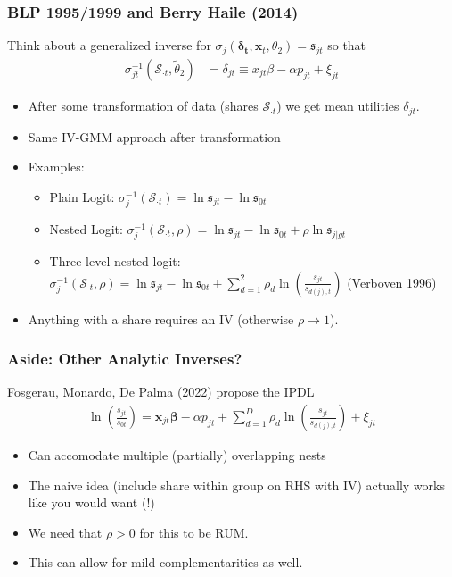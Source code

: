 \begin{frame}
\frametitle{BLP 1995/1999 and Berry Haile (2014)}
Think about a \alert{generalized inverse} for $\sigma_{j}(\boldsymbol{\delta_{t}}, \mathbf{x}_t,\theta_2) = \mathfrak{s}_{jt}$ so that 
\begin{align*}
 \sigma_{jt}^{-1}(\mathcal{S}_{\cdot t},\widetilde{\theta}_2)&= \delta_{jt} \equiv x_{jt} \beta -\alpha p_{jt} +  \xi_{jt} 
\end{align*}
 \begin{itemize}
\item After some transformation of data (shares $\mathcal{S}_{\cdot t}$) we get \alert{mean utilities} $\delta_{jt}$.
\item Same IV-GMM approach after transformation
\item Examples:
\begin{itemize}
\item Plain Logit: $\sigma_{j}^{-1}(\mathcal{S}_{\cdot t}) = \ln \mathfrak{s}_{jt}- \ln \mathfrak{s}_{0t}$
\item Nested Logit: $\sigma_{j}^{-1}(\mathcal{S}_{\cdot t},\rho) = \ln \mathfrak{s}_{jt}- \ln \mathfrak{s}_{0t} + \rho  \ln \mathfrak{s}_{j|gt}$
\item Three level nested logit: $\sigma_{j}^{-1}(\mathcal{S}_{\cdot t},\rho) = \ln \mathfrak{s}_{jt}- \ln \mathfrak{s}_{0t} +\sum_{d=1}^2 \rho_d \ln \left(\frac{s_{j t}}{s_{d(j), t}}\right)$ (Verboven 1996)
 \end{itemize}
 \item Anything with a share requires an IV (otherwise $\rho \rightarrow 1$).
 \end{itemize}
\end{frame}


\begin{frame}
\frametitle{Aside: Other Analytic Inverses?}
Fosgerau, Monardo, De Palma (2022) propose the IPDL
\begin{align*}
\ln \left(\frac{s_{j t}}{s_{0 t}}\right)=\mathbf{x}_{j t} \boldsymbol{\beta}-\alpha p_{j t}+\sum_{d=1}^D \rho_d \ln \left(\frac{s_{j t}}{s_{d(j), t}}\right)+\xi_{j t}
\end{align*}
 \begin{itemize}
\item Can accomodate multiple (partially) overlapping nests
\item The naive idea (include share within group on RHS with IV) actually works like you would want (!)
\item We need that $\rho > 0$ for this to be RUM.
\item This can allow for mild complementarities as well.
 \end{itemize}
\end{frame}




